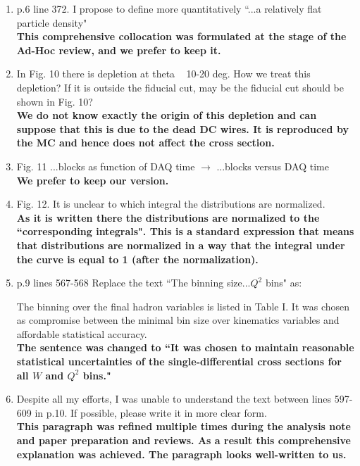 \documentclass[,superscriptaddress,showpacs,amssymb,amsmath,amsfonts,linenumbers,article]{revtex4-1}
\begin{document}
\begin{enumerate}
\item p.6 line 372. I propose to define more quantitatively ``...a relatively flat particle density"\\
{\bf This comprehensive collocation was formulated at the stage of the Ad-Hoc review, and we prefer to keep it.}


\item In Fig. 10 there is depletion at theta ~ 10-20 deg. How we treat this depletion? If it is outside the fiducial cut, may be the fiducial cut should be shown in Fig. 10?\\
{\bf We do not know exactly the origin of this depletion and can suppose that this is due to the dead DC wires. It is reproduced by the MC and hence does not affect the cross section.}



\item  Fig. 11 ...blocks as function of DAQ time $\rightarrow$ ...blocks versus DAQ time\\
{\bf We prefer to keep our version.}


\item  Fig. 12. It is unclear to which integral the distributions are normalized.\\
{\bf As it is written there the distributions are normalized to the ``corresponding integrals". This is a standard expression that means that distributions are normalized in a way that the integral under the curve is equal to 1 (after the normalization).}


\item  p.9 lines 567-568 Replace the text ``The binning size...$Q^2$ bins" as:

The binning over the final hadron variables is listed in Table I. It was chosen as compromise between the minimal bin size over kinematics variables and affordable statistical accuracy.\\
{\bf The sentence was changed to ``It was chosen to maintain reasonable statistical uncertainties of the single-differential cross sections for all $W$ and $Q^{2}$ bins."}


\item  Despite all my efforts, I was unable to understand the text between lines 597-609 in p.10. If possible, please write it in more clear form.\\
{\bf This paragraph was refined multiple times during the analysis note and paper preparation and reviews. As a result this comprehensive explanation was achieved. The paragraph looks well-written to us.}




\end{enumerate}
\end{document}
